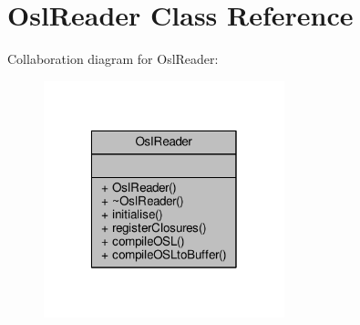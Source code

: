\hypertarget{class_osl_reader}{\section{Osl\-Reader Class Reference}
\label{class_osl_reader}
}


Collaboration diagram for Osl\-Reader\-:
\nopagebreak
\begin{figure}[H]
\begin{center}
\leavevmode
\includegraphics[width=198pt]{class_osl_reader__coll__graph}
\end{center}
\end{figure}
